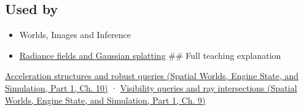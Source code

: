 \subsection{Used by}\label{appendix-0b426c47dd78-used-by}

\hypertarget{appendix-0b426c47dd78-used-by}{}

\begin{itemize}
\item
  {Worlds, Images and Inference}
\item
  \hyperref[appendix-c5b332e400e7]{Radiance fields and Gaussian splatting} \#\# Full teaching explanation
\end{itemize}

\href{../05-Spatial-Worlds-Engine-State-and-Simulation-P01/main.pdf\#nameddest=04-visual-computing-ii-ch029-acceleration-structures-and-robust-queries-1}{Acceleration structures and robust queries (Spatial Worlds, Engine State, and Simulation, Part 1, Ch. 10)} · \href{../05-Spatial-Worlds-Engine-State-and-Simulation-P01/main.pdf\#nameddest=04-visual-computing-ii-ch028-visibility-queries-and-ray-intersections-1}{Visibility queries and ray intersections (Spatial Worlds, Engine State, and Simulation, Part 1, Ch. 9)}
